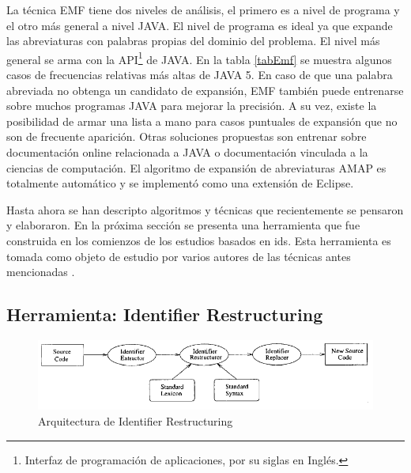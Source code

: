 La técnica EMF tiene dos niveles de análisis, el primero es a nivel de programa y el otro más general a nivel JAVA. El nivel de programa es ideal ya que expande las abreviaturas con palabras propias del dominio del problema. El nivel más general se arma con la API\footnote[1]{Interfaz de programación de aplicaciones, por su siglas en Inglés.} de JAVA. En la tabla \ref{tabEmf} se muestra algunos casos de frecuencias relativas más altas de JAVA 5. En caso de que una palabra abreviada no obtenga un candidato de expansión, EMF también puede entrenarse sobre muchos programas JAVA para mejorar la precisión. A su vez, existe la posibilidad de armar una lista a mano para casos puntuales de expansión que no son de frecuente aparición. Otras soluciones propuestas son entrenar sobre documentación online relacionada a JAVA o documentación vinculada a la ciencias de computación.
El algoritmo de expansión de abreviaturas AMAP es totalmente automático y se implementó como una extensión de Eclipse. %

Hasta ahora se han descripto algoritmos y técnicas que recientemente se pensaron y elaboraron. En la próxima sección se presenta una herramienta que fue construida en los comienzos de los estudios basados en ids. Esta herramienta es tomada como objeto de estudio por varios autores de las técnicas antes mencionadas \cite{EZH08,DCHD06,DLHD06,LFBEX07}.


\pagebreak 
\subsection{Herramienta: Identifier Restructuring}
\label{sec:algRest}


\begin{figure}[t!] %
\centerline{%
\includegraphics[scale= 0.80]{./cap3/ire_1.png}
}
\caption{Arquitectura de Identifier Restructuring}
\label{ire1}
\end{figure}

